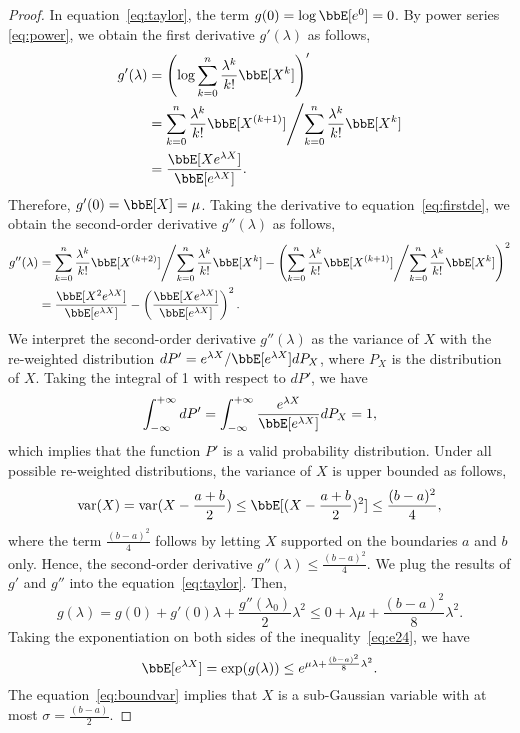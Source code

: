 \documentclass[11pt]{article}
\DeclareMathOperator{\var}{var}
\theoremstyle{plain}
\theoremstyle{definition}
\begin{document}
\begin{proof}
In equation~\eqref{eq:taylor}, the term $g(0) =\log \bbE[e^{0}] = 0$. By power series \eqref{eq:power}, we obtain the first derivative $g'(\lambda)$ as follows,
\begin{align}
	g'(\lambda ) & = \left( \log \sum_{k = 0}^n \frac{\lambda^k }{k!} \bbE[X^k]  \right)' \\
	&= {\sum_{k = 0}^n \frac{ \lambda^k }{k!} \bbE[X^{(k+1)}] }\Bigg/{\sum_{k = 0}^n \frac{\lambda^k }{k!} \bbE[X^k]}  \label{eq:firstde} \\
	&= \frac{\bbE[X e^{\lambda X} ]}{\bbE[ e^{\lambda X} ]}.
\end{align}
Therefore, $g'(0) = \bbE[X] = \mu$. Taking the derivative to equation~\eqref{eq:firstde}, we obtain the second-order derivative $g''(\lambda)$ as follows,
\begin{align}
	g''(\lambda)
	&= {\sum_{k = 0}^n \frac{ \lambda^k }{k!} \bbE[X^{(k+2)}] }\Bigg/{\sum_{k = 0}^n \frac{\lambda^k }{k!} \bbE[X^k]} - \left( {\sum_{k = 0}^n \frac{ \lambda^k }{k!} \bbE[X^{(k+1)}] }\Bigg/{\sum_{k = 0}^n \frac{\lambda^k }{k!} \bbE[X^k]}  \right)^2\\
	&= \frac{\bbE[X^2 e^{\lambda X} ]}{\bbE[ e^{\lambda X} ]} - \left( \frac{\bbE[X e^{\lambda X} ]}{\bbE[ e^{\lambda X} ]} \right)^2.\\
\end{align}
We interpret the second-order derivative $g''(\lambda)$ as the variance of $X$ with the re-weighted distribution $d P' = {e^{\lambda X}}/{\bbE[ e^{\lambda X} ]} d P_X $, where $P_X$ is the distribution of $X$. Taking the integral of 1 with respect to $dP'$, we have
\begin{equation}
	\int_{-\infty}^{+\infty} d P' = \int_{-\infty}^{+\infty}  \frac{e^{\lambda X}}{\bbE[ e^{\lambda X} ]} d P_X = 1,
\end{equation} 
which implies that the function $P'$ is a valid probability distribution. Under all possible re-weighted distributions, the variance of $X$ is upper bounded as follows,
\[ \var(X) = \var(X - \frac{a+b}{2}) \leq \bbE[(X - \frac{a+b}{2} )^2] \leq \frac{(b-a)^2}{4}, \]
where the term $\frac{(b-a)^2}{4}$ follows by letting $X$ supported on the boundaries $a$ and $b$ only. Hence, the second-order derivative $g''(\lambda) \leq \frac{(b-a)^2}{4}$. We plug the results of $g'$ and $g''$ into the equation~\eqref{eq:taylor}. Then,
\begin{equation}\label{eq:e24}
	g(\lambda) =  g(0) + g'(0) \lambda  + \frac{g''(\lambda_0) }{2} \lambda^2 \leq 0 + \lambda \mu+ \frac{(b-a)^2}{8} \lambda^2. 
\end{equation}
Taking the exponentiation on both sides of the inequality~\eqref{eq:e24}, we have
\begin{equation}\label{eq:boundvar}
	\bbE[e^{\lambda X}] = \exp(g( \lambda)) \leq e^{\mu \lambda + \frac{(b-a)^2}{8} \lambda^2}.
\end{equation}
The equation~\eqref{eq:boundvar} implies that $X$ is a sub-Gaussian variable with at most $\sigma = \frac{(b-a)}{2}$.
\end{proof}
\end{document}
